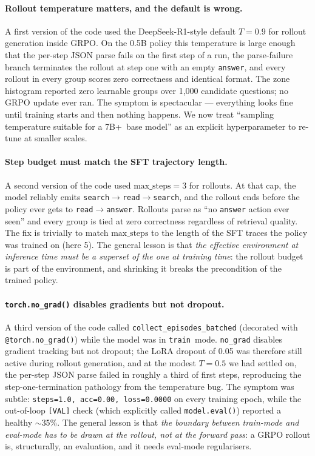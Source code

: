 \documentclass[11pt]{article}
\begin{document}
\paragraph{Rollout temperature matters, and the default is wrong.}
A first version of the code used the DeepSeek-R1-style default
$T{=}0.9$ for rollout generation inside GRPO. On the 0.5B policy
this temperature is large enough that the per-step JSON parse
fails on the first step of a run, the parse-failure branch
terminates the rollout at step one with an empty \texttt{answer},
and every rollout in every group scores zero correctness and
identical format. The zone histogram reported zero learnable
groups over 1{,}000 candidate questions; no GRPO update ever ran.
The symptom is spectacular --- everything looks fine until
training starts and then nothing happens. We now treat
``sampling temperature suitable for a 7B+~base model'' as an
explicit hyperparameter to re-tune at smaller scales.

\paragraph{Step budget must match the SFT trajectory length.}
A second version of the code used $\mathrm{max\_steps}{=}3$ for
rollouts. At that cap, the model reliably emits
\texttt{search}$\to$\texttt{read}$\to$\texttt{search}, and the
rollout ends before the policy ever gets to
\texttt{read}$\to$\texttt{answer}. Rollouts parse as ``no
\texttt{answer} action ever seen'' and every group is tied at
zero correctness regardless of retrieval quality. The fix is
trivially to match $\mathrm{max\_steps}$ to the length of the SFT
traces the policy was trained on (here 5). The general lesson is
that \emph{the effective environment at inference time must be a
superset of the one at training time}: the rollout budget is part
of the environment, and shrinking it breaks the precondition of
the trained policy.

\paragraph{\texttt{torch.no\_grad()} disables gradients but not dropout.}
A third version of the code called \texttt{collect\_episodes\_batched}
(decorated with \texttt{@torch.no\_grad()}) while the model was in
\texttt{train}~mode. \texttt{no\_grad} disables gradient tracking
but not dropout; the LoRA dropout of 0.05 was therefore still
active during rollout generation, and at the modest $T{=}0.5$ we
had settled on, the per-step JSON parse failed in roughly a third
of first steps, reproducing the step-one-termination pathology
from the temperature bug. The symptom was subtle:
\texttt{steps{=}1.0, acc{=}0.00, loss{=}0.0000} on every training
epoch, while the out-of-loop
\texttt{[VAL]} check (which explicitly called \texttt{model.eval()})
reported a healthy $\sim$35\%. The general lesson is that
\emph{the boundary between train-mode and eval-mode has to be
drawn at the rollout, not at the forward pass}: a GRPO rollout
is, structurally, an evaluation, and it needs eval-mode
regularisers.
\end{document}
